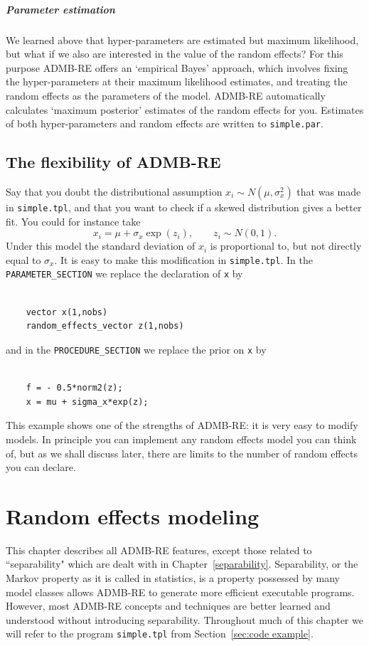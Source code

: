 \documentclass[12pt,letter,reqno]{book}
\begin{document}
\paragraph{Parameter estimation}

We learned above that hyper-parameters are estimated but maximum likelihood, but what if we also are interested
in the value of the random effects? For this purpose ADMB-RE offers an `empirical Bayes' approach, which
involves fixing the hyper-parameters at their maximum likelihood estimates, and treating the random effects as
the parameters of the model. ADMB-RE automatically calculates `maximum posterior' estimates of the random
effects for you. Estimates of both hyper-parameters and random effects are written to \texttt{simple.par}.

\section{The flexibility of ADMB-RE\label{lognormal}}

Say that you doubt the distributional assumption $x_i\sim N(\mu ,\sigma _{x}^{2})$ that was made in
\texttt{simple.tpl}, and that you want to check if a skewed distribution gives a better fit. You could for
instance take
\[
x_i=\mu +\sigma_{x}\exp (z_i),\qquad z_i\sim N(0,1).
\]
Under this model the standard deviation of $x_i$ is proportional to, but not directly equal to $\sigma_{x}$. It is
easy to make this modification in \texttt{simple.tpl}. In the \texttt{PARAMETER\_SECTION} we replace the
    declaration of \texttt{x} by
\begin{lstlisting}

    vector x(1,nobs)
    random_effects_vector z(1,nobs)

\end{lstlisting}

and in the \texttt{PROCEDURE\_SECTION} we replace the prior on \texttt{x} by
\begin{lstlisting}

    f = - 0.5*norm2(z);
    x = mu + sigma_x*exp(z);

\end{lstlisting}

This example shows one of the strengths of ADMB-RE: it is very easy to
modify models. In principle you can implement any random effects model you
can think of, but as we shall discuss later, there are limits to the number
of random effects you can declare.


\chapter{Random effects modeling}
This chapter describes all ADMB-RE features, except those related to ``separability"  which are
dealt with in Chapter~\ref{separability}. Separability, or the Markov property as it
is called in statistics, is a property possessed by many model classes allows ADMB-RE
to generate more efficient executable programs. However, most ADMB-RE concepts and techniques are better learned 
and understood without introducing separability. Throughout much of this chapter we will refer to the 
program \texttt{simple.tpl} from Section~\ref{sec:code example}.
\end{document}
